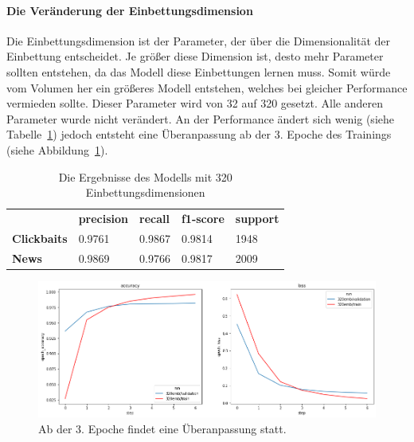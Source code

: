 \paragraph{Die Veränderung der Einbettungsdimension}
Die Einbettungsdimension ist der Parameter, der über die Dimensionalität der Einbettung entscheidet. Je größer diese Dimension ist, desto mehr Parameter sollten entstehen, da das Modell diese Einbettungen lernen muss. Somit würde vom Volumen her ein größeres Modell entstehen, welches bei gleicher Performance vermieden sollte. Dieser Parameter wird von 32 auf 320 gesetzt. Alle anderen Parameter wurde nicht verändert. An der Performance ändert sich wenig (siehe Tabelle~\ref{eval32}) jedoch entsteht eine Überanpassung ab der 3. Epoche des Trainings (siehe Abbildung~\ref{32embdpic}).

\begin{table}[h]
    \caption{Die Ergebnisse des Modells mit 320 Einbettungsdimensionen}
    \label{eval32}
    \renewcommand{\arraystretch}{1.2}
    \centering
    \sffamily
    \begin{footnotesize}
        \begin{tabular}{l l l l l}
            \toprule
                           & \textbf{precision} & \textbf{recall} & \textbf{f1-score} & \textbf{support} \\
            \textbf{Clickbaits} & 0.9761                  & 0.9867                 & 0.9814                & 1948          \\
            \textbf{News}  & 0.9869                 & 0.9766                & 0.9817               & 2009                     \\
            \bottomrule
        \end{tabular}
    \end{footnotesize}
    \rmfamily
\end{table}

\begin{figure}[H]
    \centering
    \includegraphics[width=15cm]{kapitel5/320embd.png}
    \caption[Auswirkung der Einbettungsdimensionen]{Ab der 3. Epoche findet eine Überanpassung statt.}
    \label{32embdpic}
\end{figure}

